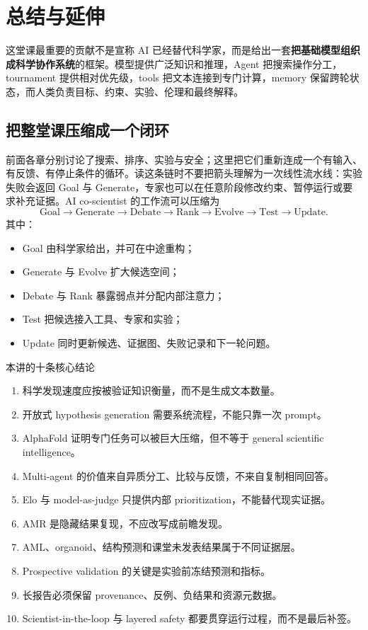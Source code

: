 \section{总结与延伸}

这堂课最重要的贡献不是宣称 AI 已经替代科学家，而是给出一套\textbf{把基础模型组织成科学协作系统}的框架。模型提供广泛知识和推理，Agent 把搜索操作分工，tournament 提供相对优先级，tools 把文本连接到专门计算，memory 保留跨轮状态，而人类负责目标、约束、实验、伦理和最终解释。

\subsection{把整堂课压缩成一个闭环}

前面各章分别讨论了搜索、排序、实验与安全；这里把它们重新连成一个有输入、有反馈、有停止条件的循环。读这条链时不要把箭头理解为一次线性流水线：实验失败会返回 Goal 与 Generate，专家也可以在任意阶段修改约束、暂停运行或要求补充证据。AI co-scientist 的工作流可以压缩为
$$
\text{Goal}
\rightarrow \text{Generate}
\rightarrow \text{Debate}
\rightarrow \text{Rank}
\rightarrow \text{Evolve}
\rightarrow \text{Test}
\rightarrow \text{Update}.
$$
其中：
\begin{itemize}
  \item Goal 由科学家给出，并可在中途重构；
  \item Generate 与 Evolve 扩大候选空间；
  \item Debate 与 Rank 暴露弱点并分配内部注意力；
  \item Test 把候选接入工具、专家和实验；
  \item Update 同时更新候选、证据图、失败记录和下一轮问题。
\end{itemize}

\begin{importantbox}{本讲的十条核心结论}
\begin{enumerate}
  \item 科学发现速度应按被验证知识衡量，而不是生成文本数量。
  \item 开放式 hypothesis generation 需要系统流程，不能只靠一次 prompt。
  \item AlphaFold 证明专门任务可以被巨大压缩，但不等于 general scientific intelligence。
  \item Multi-agent 的价值来自异质分工、比较与反馈，不来自复制相同回答。
  \item Elo 与 model-as-judge 只提供内部 prioritization，不能替代现实证据。
  \item AMR 是隐藏结果复现，不应改写成前瞻发现。
  \item AML、organoid、结构预测和课堂未发表结果属于不同证据层。
  \item Prospective validation 的关键是实验前冻结预测和指标。
  \item 长报告必须保留 provenance、反例、负结果和资源元数据。
  \item Scientist-in-the-loop 与 layered safety 都要贯穿运行过程，而不是最后补签。
\end{enumerate}
\end{importantbox}

